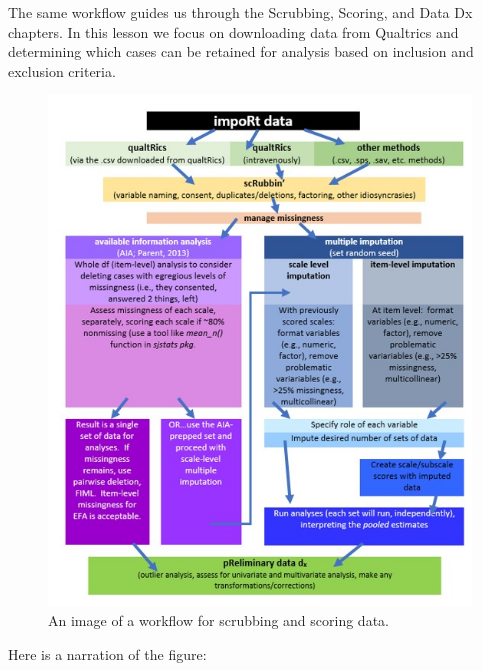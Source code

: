 \documentclass[
  11pt,
]{book}
\begin{document}
The same workflow guides us through the Scrubbing, Scoring, and Data Dx chapters. In this lesson we focus on downloading data from Qualtrics and determining which cases can be retained for analysis based on inclusion and exclusion criteria.

\begin{figure}
\centering
\includegraphics{images/Ch02/scrubscore_wrkflow.jpg}
\caption{An image of a workflow for scrubbing and scoring data.}
\end{figure}

Here is a narration of the figure:
\end{document}
